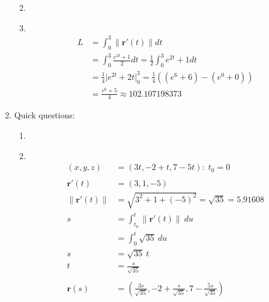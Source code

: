 \documentclass[11pt]{article}
\newcommand\Item[1][]{%
  \ifx\relax#1\relax  \item \else \item[#1] \fi
  \abovedisplayskip=0pt\abovedisplayshortskip=0pt~\vspace*{-\baselineskip}}
\begin{document}
\begin{enumerate}
\begin{enumerate}
              \Item
              \begin{align*}
                  L & = \int_{0}^{3}  \| \textbf{r}'(t) \| dt                                                                           \\
                    & = \int_{0}^{3} \frac{e^{2t}+1}{2} dt = \frac{1}{2} \int_{0}^{3} e^{2t}+1 dt                                       \\
                    & = \frac{1}{4}\Big| e^{2t} + 2t \Big|_{0}^{3}  = \frac{1}{4}\left(\left(e^{6}+6\right)-\left(e^{0}+0\right)\right) \\
                    & = \frac{e^{6}+5}{4} \approx 102.107198373
              \end{align*}
          \end{enumerate}
    \item Quick questions:
          \begin{enumerate}
              \Item
              \begin{align*}
                  (x,y,z)              & = (3t,-2+t,7-5t) : \; t_0 = 0                                            \\\\
                  \textbf{r}'(t)       & = (3, 1, -5)                                                             \\
                  \| \textbf{r}'(t) \| & = \sqrt{3^2 + 1 + (-5)^2} = \sqrt{35} = 5.91608                          \\
                  s                    & = \int_{t_{0}}^{t} \| \textbf{r}'(t) \| \ du                             \\
                                       & = \int_{0}^{t} \sqrt{35} \ du                                            \\
                  s                    & =  \sqrt{35} \ t                                                         \\
                  t                    & = \frac{s}{\sqrt{35}}                                                    \\\\
                  \textbf{r}(s)        & = (\frac{3s}{\sqrt{35}},-2 + \frac{s}{\sqrt{35}},7-\frac{5s}{\sqrt{35}})
              \end{align*}


\end{enumerate}
\end{enumerate}
\end{document}
